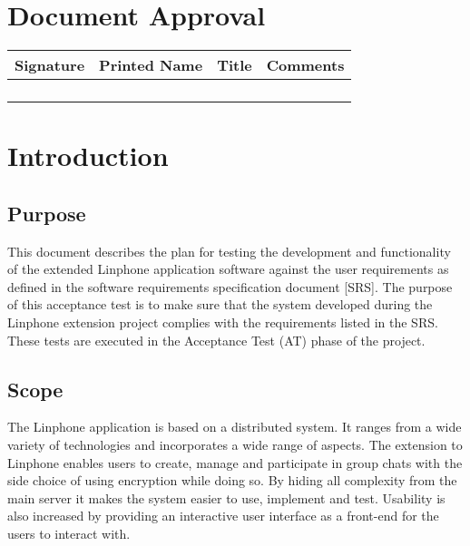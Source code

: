 \documentclass[11pt]{article}
\begin{document}
\section{Document Approval}
\begin{table}[h]
\begin{tabular}{llll}
\textbf{Signature}     & \textbf{Printed Name} & \textbf{Title}        & \textbf{Comments}     \\ \hline
\multicolumn{1}{|l|}{} & \multicolumn{1}{L{3.5cm}|}{} & \multicolumn{1}{L{3.5cm}|}{} & \multicolumn{1}{L{4cm}|}{} \\ \hline
\multicolumn{1}{|l|}{} & \multicolumn{1}{l|}{} & \multicolumn{1}{l|}{} & \multicolumn{1}{l|}{} \\ \hline
\multicolumn{1}{|l|}{} & \multicolumn{1}{l|}{} & \multicolumn{1}{l|}{} & \multicolumn{1}{l|}{} \\ \hline
\multicolumn{1}{|l|}{} & \multicolumn{1}{l|}{} & \multicolumn{1}{l|}{} & \multicolumn{1}{l|}{} \\ \hline
\end{tabular}
\end{table}

\newpage

\section{Introduction}
\subsection{Purpose}
This document describes the plan for testing the development and functionality of the extended Linphone application software against the
user requirements as defined in the software requirements specification document [SRS]. The purpose of this acceptance test is to make sure
that the system developed during the Linphone extension project complies with the requirements listed in the SRS. These tests are executed in the Acceptance Test (AT) phase of the project.

\subsection{Scope}
The Linphone application is based on a distributed system. It ranges from a wide variety of technologies and incorporates a wide range of aspects. The extension to Linphone enables users to create, manage and participate in group chats with the side choice of using encryption while doing so. By hiding all complexity from the main server it makes the system easier to use, implement and test. Usability is also increased by providing an interactive user interface as a front-end for the users to interact with.
\end{document}
